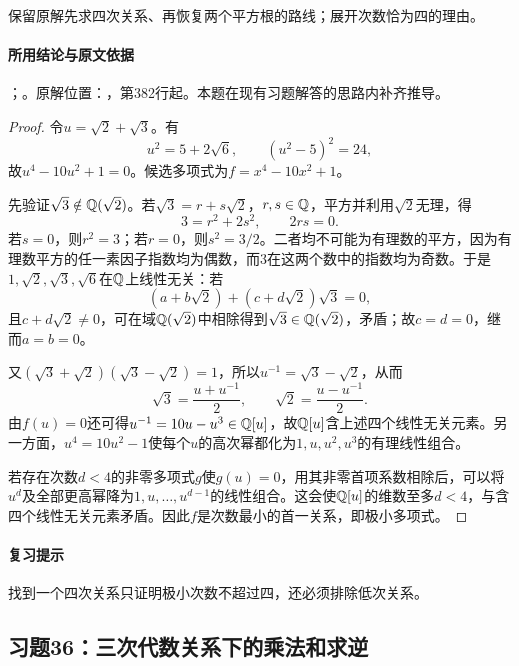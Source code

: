 保留原解先求四次关系、再恢复两个平方根的路线；展开次数恰为四的理由。

\paragraph{所用结论与原文依据}

；。原解位置：，第382行起。本题在现有习题解答的思路内补齐推导。


\begin{proof}

令$u=\sqrt2+\sqrt3$。有
\[
u^2=5+2\sqrt6,\qquad (u^2-5)^2=24,
\]
故$u^4-10u^2+1=0$。候选多项式为$f=x^4-10x^2+1$。

先验证$\sqrt3\notin\mathbb Q(\sqrt2)$。若$\sqrt3=r+s\sqrt2$，$r,s\in\mathbb Q$，平方并利用$\sqrt2$无理，得
\[
3=r^2+2s^2,
\qquad 2rs=0.
\]
若$s=0$，则$r^2=3$；若$r=0$，则$s^2=3/2$。二者均不可能为有理数的平方，因为有理数平方的任一素因子指数均为偶数，而$3$在这两个数中的指数均为奇数。于是$1,\sqrt2,\sqrt3,\sqrt6$在$\mathbb Q$上线性无关：若
\[
(a+b\sqrt2)+(c+d\sqrt2)\sqrt3=0,
\]
且$c+d\sqrt2\ne0$，可在域$\mathbb Q(\sqrt2)$中相除得到$\sqrt3\in\mathbb Q(\sqrt2)$，矛盾；故$c=d=0$，继而$a=b=0$。

又$(\sqrt3+\sqrt2)(\sqrt3-\sqrt2)=1$，所以$u^{-1}=\sqrt3-\sqrt2$，从而
\[
\sqrt3=\frac{u+u^{-1}}2,\qquad
\sqrt2=\frac{u-u^{-1}}2.
\]
由$f(u)=0$还可得$u^{-1}=10u-u^3\in\mathbb Q[u]$，故$\mathbb Q[u]$含上述四个线性无关元素。另一方面，$u^4=10u^2-1$使每个$u$的高次幂都化为$1,u,u^2,u^3$的有理线性组合。

若存在次数$d<4$的非零多项式$g$使$g(u)=0$，用其非零首项系数相除后，可以将$u^d$及全部更高幂降为$1,u,\ldots,u^{d-1}$的线性组合。这会使$\mathbb Q[u]$的维数至多$d<4$，与含四个线性无关元素矛盾。因此$f$是次数最小的首一关系，即极小多项式。

\end{proof}

\paragraph{复习提示}

找到一个四次关系只证明极小次数不超过四，还必须排除低次关系。



\subsection{习题36：三次代数关系下的乘法和求逆}

